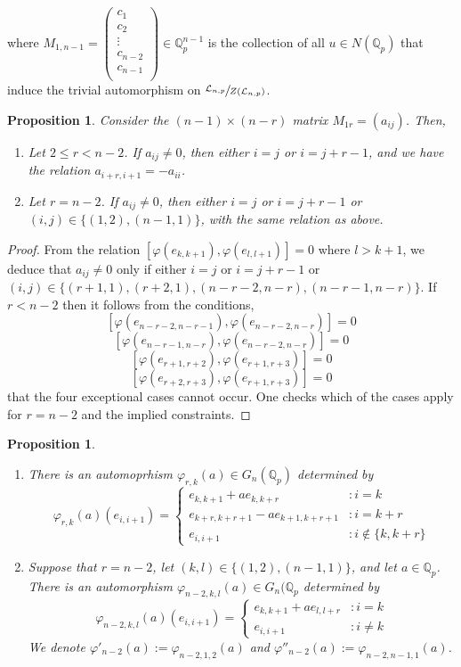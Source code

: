 \documentclass[12pt]{article}
\newtheorem{proposition}[theorem]{Proposition}
\begin{document}
where $M_{1,n-1}=\begin{pmatrix}
c_{1}\\
c_{2}\\
\vdots\\
c_{n-2}\\
c_{n-1}\\
\end{pmatrix}\in\mathbb{Q}_{p}^{n-1}$ is the collection of all $u\in{N(\mathbb{Q}_{p})}$ that induce the trivial automorphism on $\sfrac{\mathcal{L}_{n,p}}{Z(\mathcal{L}_{n,p})}$.
\begin{proposition}
\label{block.1r.structure}
Consider the $(n-1)\times{(n-r)}$ matrix $M_{1r}=(a_{ij})$. Then,
\begin{enumerate}
    \item Let $2\leq{r}<{n-2}$. If $a_{ij}\neq{0}$, then either $i=j$ or $i=j+r-1$, and we have the relation $a_{i+r,i+1}=-a_{ii}$.
    \item Let $r=n-2$. If $a_{ij}\neq{0}$, then either $i=j$ or $i=j+r-1$ or $(i,j)\in\{(1,2),(n-1,1)\}$, with the same relation as above.
\end{enumerate}
\end{proposition}
\begin{proof}
From the relation $[\varphi(e_{k,k+1}),\varphi(e_{l,l+1})]=0$ where $l>k+1$, we deduce that $a_{ij}\neq{0}$ only if either $i=j$ or $i=j+r-1$ or $(i,j)\in\{(r+1,1),(r+2,1),(n-r-2,n-r),(n-r-1,n-r)\}$. If $r<n-2$ then it follows from the conditions,
\[
[\varphi(e_{n-r-2,n-r-1}),\varphi(e_{n-r-2,n-r})]=0
\]
\[
[\varphi(e_{n-r-1,n-r}),\varphi(e_{n-r-2,n-r})]=0
\]
\[
[\varphi(e_{r+1,r+2}),\varphi(e_{r+1,r+3})]=0
\]
\[
[\varphi(e_{r+2,r+3}),\varphi(e_{r+1,r+3})]=0
\]
that the four exceptional cases cannot occur. One checks which of the cases apply for $r=n-2$ and the implied constraints.
\end{proof}
\begin{proposition}
\label{phi.r.k}
\begin{enumerate}
Let $2\leq{r}\leq{n-2}$, and let $0\leq{k}\leq{n-r}$, and let $a\in\mathbb{Q}_{p}$. 
\item There is an automoprhism $\varphi_{r,k}(a)\in{G_n(\mathbb{Q}_{p})}$ determined by \[
    \varphi_{r,k}(a)(e_{i,i+1})=\begin{cases}
        e_{k,k+1}+a{e_{k,k+r}} & : i=k\\
        e_{k+r,k+r+1}-a{e_{k+1,k+r+1}} & : i=k+r\\
        e_{i,i+1} & : i\notin\{k,k+r\}
    \end{cases}
\]
\item Suppose that $r=n-2$, let $(k,l)\in\{(1,2),(n-1,1)\}$, and let $a\in\mathbb{Q}_{p}$. There is an automorphism $\varphi_{n-2,k,l}(a)\in{G_n(\mathbb{Q}_{p}}$ determined by \[
    \varphi_{n-2,k,l}(a)(e_{i,i+1})=\begin{cases}
        e_{k,k+1}+a{e_{l,l+r}} & : i=k\\
        e_{i,i+1} & : i\neq{k}
    \end{cases}
\]
    We denote $\varphi'_{n-2}(a):=\varphi_{n-2,1,2}(a)$ and $\varphi''_{n-2}(a):=\varphi_{n-2,n-1,1}(a)$.
\end{enumerate}
\end{proposition}
\end{document}
